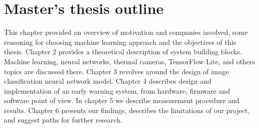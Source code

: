 \section{ Master's thesis outline}

This chapter provided an overview of motivation and companies involved, some reasoning for choosing machine learning approach and the objectives of this thesis.
Chapter 2 provides a theoretical description of system building blocks. Machine learning, neural networks, thermal cameras, TensorFlow Lite, and others topics are discussed there.
Chapter 3 revolves around the design of image classification neural network model.
Chapter 4 describes design and implementation of an early warning system, from hardware, firmware and software point of view.
In chapter 5 we describe measurement procedure and results.
Chapter 6 presents our findings, describes the limitations of our project, and suggest paths for further research.

